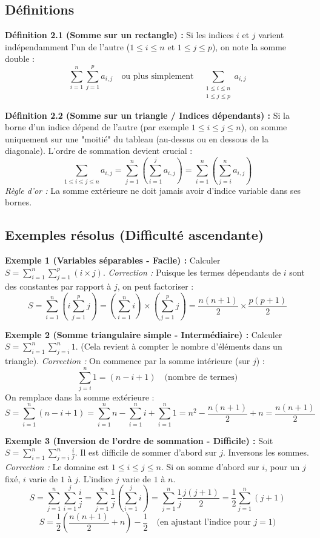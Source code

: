 \subsection{Définitions}

\textbf{Définition 2.1 (Somme sur un rectangle) :} Si les indices $i$ et $j$ varient indépendamment l'un de l'autre ($1 \le i \le n$ et $1 \le j \le p$), on note la somme double :
\[ \sum_{i=1}^{n} \sum_{j=1}^{p} a_{i,j} \quad \text{ou plus simplement} \quad \sum_{\substack{1 \le i \le n \\ 1 \le j \le p}} a_{i,j} \]

\textbf{Définition 2.2 (Somme sur un triangle / Indices dépendants) :} Si la borne d'un indice dépend de l'autre (par exemple $1 \le i \le j \le n$), on somme uniquement sur une "moitié" du tableau (au-dessus ou en dessous de la diagonale). L'ordre de sommation devient crucial :
\[ \sum_{1 \le i \le j \le n} a_{i,j} = \sum_{j=1}^{n} \left( \sum_{i=1}^{j} a_{i,j} \right) = \sum_{i=1}^{n} \left( \sum_{j=i}^{n} a_{i,j} \right) \]
\textit{Règle d'or :} La somme extérieure ne doit jamais avoir d'indice variable dans ses bornes.

\subsection{Exemples résolus (Difficulté ascendante)}

\textbf{Exemple 1 (Variables séparables - Facile) :} 
Calculer $S = \sum_{i=1}^{n} \sum_{j=1}^{p} (i \times j)$.
\textit{Correction :} Puisque les termes dépendants de $i$ sont des constantes par rapport à $j$, on peut factoriser :
\[ S = \sum_{i=1}^{n} \left( i \sum_{j=1}^{p} j \right) = \left( \sum_{i=1}^{n} i \right) \times \left( \sum_{j=1}^{p} j \right) = \frac{n(n+1)}{2} \times \frac{p(p+1)}{2} \]

\textbf{Exemple 2 (Somme triangulaire simple - Intermédiaire) :}
Calculer $S = \sum_{i=1}^{n} \sum_{j=i}^{n} 1$. (Cela revient à compter le nombre d'éléments dans un triangle).
\textit{Correction :} On commence par la somme intérieure (sur $j$) :
\[ \sum_{j=i}^{n} 1 = (n - i + 1) \quad \text{(nombre de termes)} \]
On remplace dans la somme extérieure :
\[ S = \sum_{i=1}^{n} (n - i + 1) = \sum_{i=1}^{n} n - \sum_{i=1}^{n} i + \sum_{i=1}^{n} 1 = n^2 - \frac{n(n+1)}{2} + n = \frac{n(n+1)}{2} \]

\textbf{Exemple 3 (Inversion de l'ordre de sommation - Difficile) :}
Soit $S = \sum_{i=1}^{n} \sum_{j=i}^{n} \frac{i}{j}$. Il est difficile de sommer d'abord sur $j$. Inversons les sommes.
\textit{Correction :} Le domaine est $1 \le i \le j \le n$. 
Si on somme d'abord sur $i$, pour un $j$ fixé, $i$ varie de $1$ à $j$. L'indice $j$ varie de $1$ à $n$.
\[ S = \sum_{j=1}^{n} \sum_{i=1}^{j} \frac{i}{j} = \sum_{j=1}^{n} \frac{1}{j} \left( \sum_{i=1}^{j} i \right) = \sum_{j=1}^{n} \frac{1}{j} \frac{j(j+1)}{2} = \frac{1}{2} \sum_{j=1}^{n} (j+1) \]
\[ S = \frac{1}{2} \left( \frac{n(n+1)}{2} + n \right) - \frac{1}{2} \quad \text{(en ajustant l'indice pour } j=1) \]

